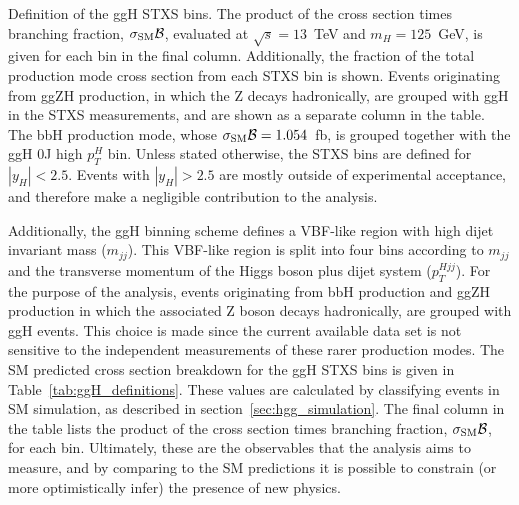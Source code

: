 \begin{table}[htb!]
    \caption[ggH STXS bin definitions]{Definition of the ggH STXS bins. The product of the cross section times \Hgg branching fraction, $\sigma_{\rm{SM}}\mathcal{B}$, evaluated at $\sqrt{s}=13$~TeV and $m_H=125$~GeV, is given for each bin in the final column. Additionally, the fraction of the total production mode cross section from each STXS bin is shown. Events originating from ggZH production, in which the Z decays hadronically, are grouped with ggH in the STXS measurements, and are shown as a separate column in the table. The bbH production mode, whose $\sigma_{\rm{SM}}\mathcal{B}=1.054$~fb, is grouped together with the ggH 0J high $p_T^H$ bin. Unless stated otherwise, the STXS bins are defined for $|y_H|<2.5$. Events with $|y_H|>2.5$ are mostly outside of experimental acceptance, and therefore make a negligible contribution to the \Hgg analysis.}
    \label{tab:ggH_definitions}
    \centering
    \scriptsize
    \renewcommand{\arraystretch}{1.2}
    \setlength{\tabcolsep}{3pt}
    \hspace*{-3cm}
    
    \hspace*{-3cm}
\end{table}

Additionally, the ggH binning scheme defines a VBF-like region with high dijet invariant mass ($m_{jj}$). This VBF-like region is split into four bins according to $m_{jj}$ and the transverse momentum of the Higgs boson plus dijet system ($p_T^{Hjj}$). For the purpose of the \Hgg analysis, events originating from bbH production and ggZH production in which the associated Z boson decays hadronically, are grouped with ggH events. This choice is made since the current available data set is not sensitive to the independent measurements of these rarer production modes. The SM predicted cross section breakdown for the ggH STXS bins is given in Table~\ref{tab:ggH_definitions}. These values are calculated by classifying events in SM simulation, as described in section~\ref{sec:hgg_simulation}. The final column in the table lists the product of the cross section times \Hgg branching fraction, $\sigma_{\rm{SM}}\mathcal{B}$, for each bin. Ultimately, these are the observables that the \Hgg analysis aims to measure, and by comparing to the SM predictions it is possible to constrain (or more optimistically infer) the presence of new physics.

